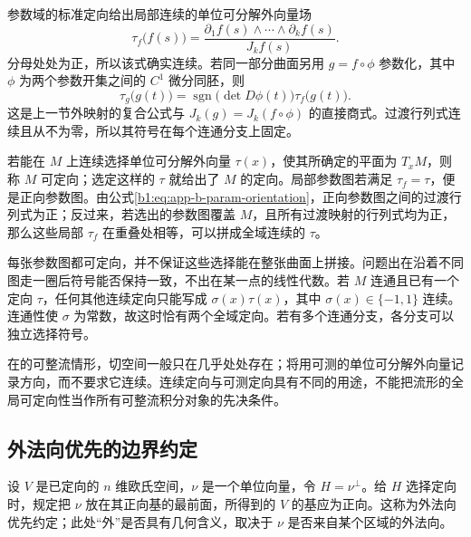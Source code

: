 \ProseParagraphBreak

参数域的标准定向给出局部连续的单位可分解外向量场
\[
 \tau_f\bigl(f(s)\bigr)
 =\frac{\partial_1f(s)\wedge\cdots\wedge\partial_kf(s)}
        {J_kf(s)}.
\]
分母处处为正，所以该式确实连续。若同一部分曲面另用 \(g=f\circ\phi\) 参数化，其中 \(\phi\) 为两个参数开集之间的 \(C^1\) 微分同胚，则
\begin{equation}\label{b1:eq:app-b-param-orientation}
 \tau_g\bigl(g(t)\bigr)
   =\operatorname{sgn}\bigl(\det D\phi(t)\bigr)
      \tau_f\bigl(g(t)\bigr).
\end{equation}
这是上一节外映射的复合公式与 \(J_k(g)=J_k(f\circ\phi)\) 的直接商式。过渡行列式连续且从不为零，所以其符号在每个连通分支上固定。

\ProseParagraphBreak

若能在 \(M\) 上连续选择单位可分解外向量 \(\tau(x)\)，使其所确定的平面为 \(T_xM\)，则称 \(M\) 可定向；选定这样的 \(\tau\) 就给出了 \(M\) 的定向。局部参数图若满足 \(\tau_f=\tau\)，便是正向参数图。由公式\eqref{b1:eq:app-b-param-orientation}，正向参数图之间的过渡行列式为正；反过来，若选出的参数图覆盖 \(M\)，且所有过渡映射的行列式均为正，那么这些局部 \(\tau_f\) 在重叠处相等，可以拼成全域连续的 \(\tau\)。

\ProseParagraphBreak

每张参数图都可定向，并不保证这些选择能在整张曲面上拼接。问题出在沿着不同图走一圈后符号能否保持一致，不出在某一点的线性代数。若 \(M\) 连通且已有一个定向 \(\tau\)，任何其他连续定向只能写成 \(\sigma(x)\tau(x)\)，其中 \(\sigma(x)\in\{-1,1\}\) 连续。连通性使 \(\sigma\) 为常数，故这时恰有两个全域定向。若有多个连通分支，各分支可以独立选择符号。

\ProseParagraphBreak

在的可整流情形，切空间一般只在几乎处处存在；将用可测的单位可分解外向量记录方向，而不要求它连续。连续定向与可测定向具有不同的用途，不能把流形的全局可定向性当作所有可整流积分对象的先决条件。

\subsection{外法向优先的边界约定}
\label{b1:subsec:B10503}

设 \(V\) 是已定向的 \(n\) 维欧氏空间，\(\nu\) 是一个单位向量，令 \(H=\nu^\perp\)。给 \(H\) 选择定向时，规定把 \(\nu\) 放在其正向基的最前面，所得到的 \(V\) 的基应为正向。这称为外法向优先约定；此处“外”是否具有几何含义，取决于 \(\nu\) 是否来自某个区域的外法向。

